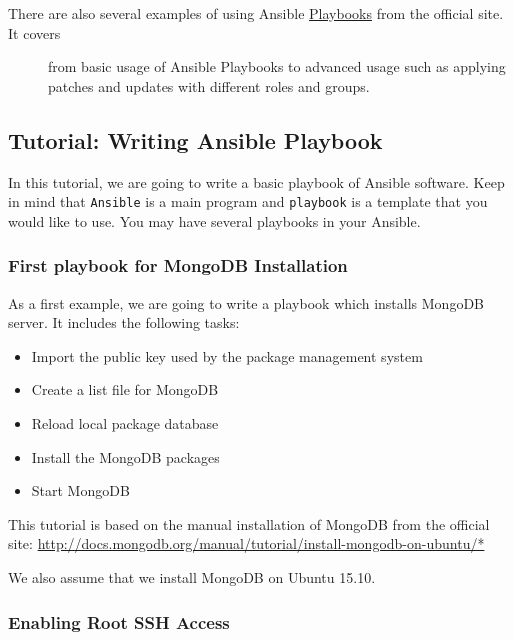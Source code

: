 \begin{description}
\item[There are also several examples of using Ansible
\href{http://docs.ansible.com/playbooks.html}{Playbooks} from the
official site. It covers]
from basic usage of Ansible Playbooks to advanced usage such as applying
patches and updates with different roles and groups.
\end{description}

\subsection{Tutorial: Writing Ansible
Playbook}\label{tutorial-writing-ansible-playbook}

In this tutorial, we are going to write a basic playbook of Ansible
software. Keep in mind that \texttt{Ansible} is a main program and
\texttt{playbook} is a template that you would like to use. You may have
several playbooks in your Ansible.

\subsubsection{First playbook for MongoDB
Installation}\label{first-playbook-for-mongodb-installation}

As a first example, we are going to write a playbook which installs
MongoDB server. It includes the following tasks:

\begin{itemize}

\item
  Import the public key used by the package management system
\item
  Create a list file for MongoDB
\item
  Reload local package database
\item
  Install the MongoDB packages
\item
  Start MongoDB
\end{itemize}

This tutorial is based on the manual installation of MongoDB from the
official site:
\url{http://docs.mongodb.org/manual/tutorial/install-mongodb-on-ubuntu/*}

We also assume that we install MongoDB on Ubuntu 15.10.

\subsubsection{Enabling Root SSH Access}\label{enabling-root-ssh-access}

